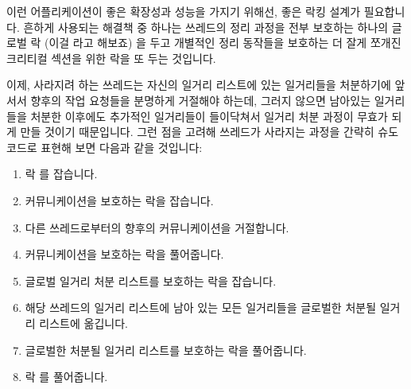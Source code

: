 {	이런 어플리케이션이 좋은 확장성과 성능을 가지기 위해선, 좋은 락킹
	설계가 필요합니다.
	흔하게 사용되는 해결책 중 하나는 쓰레드의 정리 과정을 전부 보호하는
	하나의 글로벌 락 (이걸  라고 해보죠) 을 두고 개별적인 정리
	동작들을 보호하는 더 잘게 쪼개진 크리티컬 섹션을 위한 락을 또 두는
	것입니다.

	이제, 사라지려 하는 쓰레드는 자신의 일거리 리스트에 있는 일거리들을
	처분하기에 앞서서 향후의 작업 요청들을 분명하게 거절해야 하는데, 그러지
	않으면 남아있는 일거리들을 처분한 이후에도 추가적인 일거리들이
	들이닥쳐서 일거리 처분 과정이 무효가 되게 만들 것이기 때문입니다.
	그런 점을 고려해 쓰레드가 사라지는 과정을 간략히 슈도코드로 표현해 보면
	다음과 같을 것입니다:

	\begin{enumerate}
	\item	락  를 잡습니다.
	\item	커뮤니케이션을 보호하는 락을 잡습니다.
	\item	다른 쓰레드로부터의 향후의 커뮤니케이션을 거절합니다.
	\item	커뮤니케이션을 보호하는 락을 풀어줍니다.
	\item	글로벌 일거리 처분 리스트를 보호하는 락을 잡습니다.
	\item	해당 쓰레드의 일거리 리스트에 남아 있는 모든 일거리들을
		글로벌한 처분될 일거리 리스트에 옮깁니다.
	\item	글로벌한 처분될 일거리 리스트를 보호하는 락을 풀어줍니다.
	\item	락  를 풀어줍니다.
	\end{enumerate}

}
